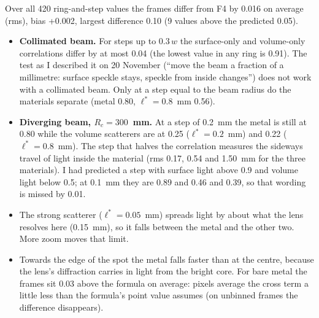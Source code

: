 \documentclass[11pt]{article}
\newcommand{\beamRms}{0.016}
\newcommand{\beamBias}{+0.002}
\newcommand{\beamCount}{420}
\newcommand{\beamOver}{9}
\newcommand{\beamWorst}{0.10}
\newcommand{\beamFlatGap}{0.04}
\newcommand{\beamFlatAtW}{metal 0.80, $\ell^*=0.8$~mm 0.56}
\newcommand{\beamBestStep}{0.2}
\newcommand{\beamBestMetal}{0.80}
\newcommand{\beamBestVol}{0.25 ($\ell^*=0.2$~mm) and 0.22 ($\ell^*=0.8$~mm)}
\newcommand{\beamTenthMetal}{0.89}
\newcommand{\beamTenthVol}{0.46 and 0.39}
\newcommand{\beamFlatMin}{0.91}
\newcommand{\beamMetalBias}{0.03}
\newcommand{\beamSpread}{0.17, 0.54 and 1.50}
\begin{document}
\noindent Over all \beamCount{} ring-and-step values the frames differ from F4 by \beamRms{} on average (rms), bias
\beamBias, largest difference \beamWorst{} (\beamOver{} values above the predicted 0.05).
\begin{itemize}
\item \textbf{Collimated beam.} For steps up to $0.3\,w$ the surface-only and volume-only correlations differ by at
  most \beamFlatGap{} (the lowest value in any ring is \beamFlatMin). The test as I described it on 20 November (``move the beam a fraction of a millimetre: surface
  speckle stays, speckle from inside changes'') does not work with a collimated beam. Only at a step equal to the
  beam radius do the materials separate (\beamFlatAtW).
\item \textbf{Diverging beam, $R_c=300$~mm.} At a step of \beamBestStep~mm the metal is still at \beamBestMetal{}
  while the volume scatterers are at \beamBestVol. The step that halves the correlation measures the sideways travel
  of light inside the material (rms \beamSpread~mm for the three materials). I had predicted a step with surface
  light above 0.9 and volume light below 0.5; at 0.1~mm they are \beamTenthMetal{} and \beamTenthVol, so that wording is
  missed by 0.01.
\item The strong scatterer ($\ell^*=0.05$~mm) spreads light by about what the lens resolves here (0.15~mm), so it
  falls between the metal and the other two. More zoom moves that limit.
\item Towards the edge of the spot the metal falls faster than at the centre, because the lens's diffraction carries
  in light from the bright core. For bare metal the frames sit \beamMetalBias{} above the formula on average: pixels
  average the cross term a little less than the formula's point value assumes (on unbinned frames the difference
  disappears).
\end{itemize}
\end{document}
